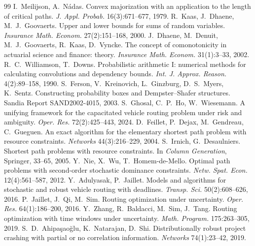 \documentclass[11pt]{article}
\theoremstyle{definition}
\begin{document}
\begin{thebibliography}{99}
 I.~Meilijson, A.~N\'adas. Convex majorization with an application to the length of critical paths. \emph{J. Appl. Probab.} 16(3):671--677, 1979.
 R.~Kaas, J.~Dhaene, M.~J.~Goovaerts. Upper and lower bounds for sums of random variables. \emph{Insurance Math. Econom.} 27(2):151--168, 2000.
 J.~Dhaene, M.~Denuit, M.~J.~Goovaerts, R.~Kaas, D.~Vyncke. The concept of comonotonicity in actuarial science and finance: theory. \emph{Insurance Math. Econom.} 31(1):3--33, 2002.
 R.~C.~Williamson, T.~Downs. Probabilistic arithmetic I: numerical methods for calculating convolutions and dependency bounds. \emph{Int. J. Approx. Reason.} 4(2):89--158, 1990.
 S.~Ferson, V.~Kreinovich, L.~Ginzburg, D.~S.~Myers, K.~Sentz. Constructing probability boxes and Dempster--Shafer structures. Sandia Report SAND2002-4015, 2003.
 S.~Ghosal, C.~P.~Ho, W.~Wiesemann. A unifying framework for the capacitated vehicle routing problem under risk and ambiguity. \emph{Oper. Res.} 72(2):425--443, 2024.
 D.~Feillet, P.~Dejax, M.~Gendreau, C.~Gueguen. An exact algorithm for the elementary shortest path problem with resource constraints. \emph{Networks} 44(3):216--229, 2004.
 S.~Irnich, G.~Desaulniers. Shortest path problems with resource constraints. In \emph{Column Generation}, Springer, 33--65, 2005.
 Y.~Nie, X.~Wu, T.~Homem-de-Mello. Optimal path problems with second-order stochastic dominance constraints. \emph{Netw. Spat. Econ.} 12(4):561--587, 2012.
 Y.~Adulyasak, P.~Jaillet. Models and algorithms for stochastic and robust vehicle routing with deadlines. \emph{Transp. Sci.} 50(2):608--626, 2016.
 P.~Jaillet, J.~Qi, M.~Sim. Routing optimization under uncertainty. \emph{Oper. Res.} 64(1):186--200, 2016.
 Y.~Zhang, R.~Baldacci, M.~Sim, J.~Tang. Routing optimization with time windows under uncertainty. \emph{Math. Program.} 175:263--305, 2019.
 S.~D.~Ahipa\c{s}ao\u{g}lu, K.~Natarajan, D.~Shi. Distributionally robust project crashing with partial or no correlation information. \emph{Networks} 74(1):23--42, 2019.
\end{thebibliography}
\end{document}
